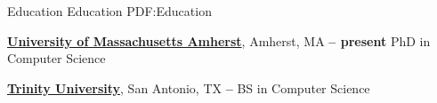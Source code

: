 \Section
{Education}
{Education}
{PDF:Education}

\Entry
\href{https://www.cics.umass.edu/}
{\textbf{University of Massachusetts Amherst}},
Amherst, MA
\dotfill
\textbf{ -- present}
\SubEntry
\Gap
PhD in Computer Science

\BigGap
\Entry
\href{https://new.trinity.edu/academics/departments/computer-science}
{\textbf{Trinity University}},
San Antonio, TX
\dotfill
\textbf{ -- }
\SubEntry
\Gap
BS in Computer Science
